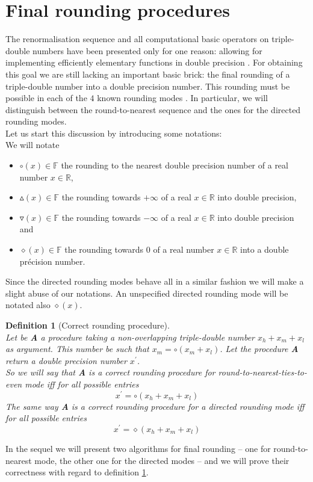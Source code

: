 \documentclass[a4paper,10pt,twoside]{article}
\newtheorem{definition}[theorem]{Definition}
\newcommand{\F}{\ensuremath{\mathbb {F}}}
\newcommand{\R}{\ensuremath{\mathbb {R}}}
\newcommand{\hi}{\ensuremath{\mathit{h}}}
\newcommand{\mi}{\ensuremath{\mathit{m}}}
\newcommand{\lo}{\ensuremath{\mathit{l}}}
\begin{document}
\section{Final rounding procedures}
The renormalisation sequence and all computational basic operators on triple-double numbers have been presented only
for one reason: allowing for implementing efficiently elementary functions in double precision 
\cite{Defour-thesis, crlibmweb, DinDefLau2004LIP}. For obtaining this 
goal we are still lacking an important basic brick: the final rounding of a triple-double number into a double precision
number. This rounding must be possible in each of the $4$ known rounding modes \cite{IEEE754}. In particular, we will 
distinguish between the round-to-nearest sequence and the ones for the directed rounding modes.\\ 
Let us start this discussion by introducing some notations:\\
We will notate
\begin{itemize}
\item $\circ \left( x \right) \in \F$ the rounding to the nearest double precision number of a real number $x \in \R$,
\item $\vartriangle \left( x \right) \in \F$ the rounding towards $+\infty$ of a real $x \in \R$ into double precision,
\item $\triangledown \left( x \right) \in \F$ the rounding towards $-\infty$ of a real $x \in \R$ into double precision and
\item $\diamond \left( x \right) \in \F$ the rounding towards $0$ of a real number $x \in \R$ into a double pr\'ecision number.
\end{itemize}
Since the directed rounding modes behave all in a similar fashion we will make a slight abuse of our notations. An 
unspecified directed rounding mode will be notated also $\diamond \left( x \right)$.
\begin{definition}[Correct rounding procedure] \label{defprocarrcorr} ~ \\
Let be {\bf A} a procedure taking a non-overlapping triple-double number $x_\hi + x_\mi + x_\lo$ as argument. This number be 
such that 
$x_\mi = \circ \left( x_\mi + x_\lo \right)$.
Let the procedure {\bf A} return a double precision number $x^\prime$.\\
So we will say that {\bf A} is a correct rounding procedure for round-to-nearest-ties-to-even mode iff
for all possible entries
$$x^\prime = \circ \left( x_\hi + x_\mi + x_\lo \right)$$
The same way {\bf A} is a correct rounding procedure for a directed rounding mode iff for all possible entries
$$x^\prime = \diamond \left( x_\hi + x_\mi + x_\lo \right)$$
\end{definition}
In the sequel we will present two algorithms for final rounding -- one for round-to-nearest mode, the other one for 
the directed modes -- and we will prove their correctness with regard to definition \ref{defprocarrcorr}.
\end{document}
